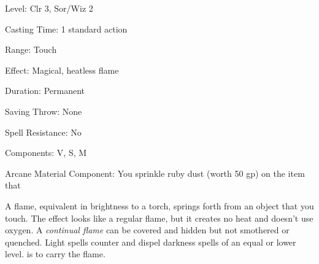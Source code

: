 
\begin{description*}
\item[Level:] Clr 3, Sor/Wiz 2
\item[Casting Time:] 1 standard action
\item[Range:] Touch
\item[Effect:] Magical, heatless flame
\item[Duration:] Permanent
\item[Saving Throw:] None
\item[Spell Resistance:] No
\item[Components:] V, S, M
\item[Arcane Material Component:] You sprinkle ruby dust (worth 50 gp) on the item that
\end{description*}

A flame, equivalent in brightness to a torch, springs forth from an object that
you touch. The effect looks like a regular flame, but it creates no heat and doesn't
use oxygen. A \textit{continual flame} can be covered and hidden but not smothered
or quenched.
Light spells counter and dispel darkness spells of an equal or lower level.
is to carry the flame.